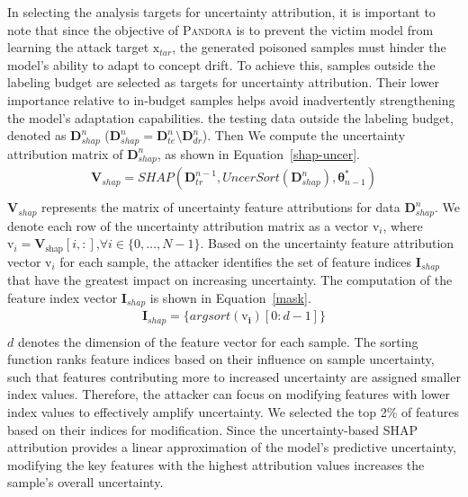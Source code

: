 \documentclass[lettersize,journal]{IEEEtran}
\newcommand{\pandora}{{\scshape Pandora}\xspace}
\begin{document}
In selecting the analysis targets for uncertainty attribution, it is important to note that since the objective of \pandora is to prevent the victim model from learning the attack target  $\bm{\mathrm{x}}_{tar}$, the generated poisoned samples must hinder the model’s ability to adapt to concept drift.
To achieve this, samples outside the labeling budget are selected as targets for uncertainty attribution.
Their lower importance relative to in-budget samples helps avoid inadvertently strengthening the model’s adaptation capabilities.
the testing data outside the labeling budget, denoted as $\bm{D}_{shap}^{n}$ ($\bm{D}_{shap}^{n} = \bm{D}_{te}^{n} \setminus \bm{D}_{dr}^{n}$).
Then We compute the uncertainty attribution matrix of $\bm{D}_{shap}^{n}$, as shown in Equation~\ref{shap-uncer}.
\begin{equation}
	\begin{aligned}
		\bm{V}_{shap} = SHAP (\bm{D}_{tr}^{n-1},UncerSort(\bm{D}_{shap}^{n}),\bm{\theta}_{n-1}^{*}) \\
	\end{aligned}
	\label{shap-uncer}
\end{equation}
$\bm{V}_{shap}$ represents the matrix of uncertainty feature attributions for data $\bm{D}_{shap}^{n}$.
We denote each row of the uncertainty attribution matrix as a vector $\bm{\mathrm{v}}_{i}$, where $\bm{\mathrm{v}}_{i} =\bm{V}_{\text{shap}}[i,:]$,$\forall i \in \{0, \dots, N-1 \}$.
Based on the uncertainty feature attribution vector $\bm{\mathrm{v}}_{i}$ for each sample, the attacker identifies the set of feature indices $\bm{I}_{shap}$ that have the greatest impact on increasing uncertainty.
The computation of the feature index vector $\bm{I}_{shap}$ is shown in Equation~\ref{mask}.
\begin{equation}
	\begin{aligned}
		\bm{I}_{shap} = \{ argsort(\bm{\mathrm{v}_{i}})[0:d-1]  \} \\
		\end{aligned}
	\label{mask}
\end{equation}
$d$ denotes the dimension of the feature vector for each sample.
The sorting function ranks feature indices based on their influence on sample uncertainty, such that features contributing more to increased uncertainty are assigned smaller index values.  
Therefore, the attacker can focus on modifying features with lower index values to effectively amplify uncertainty.
We selected the top 2\% of features based on their indices for modification.
Since the uncertainty-based SHAP attribution provides a linear approximation of the model's predictive uncertainty, modifying the key features with the highest attribution values increases the sample's overall uncertainty.
\end{document}
